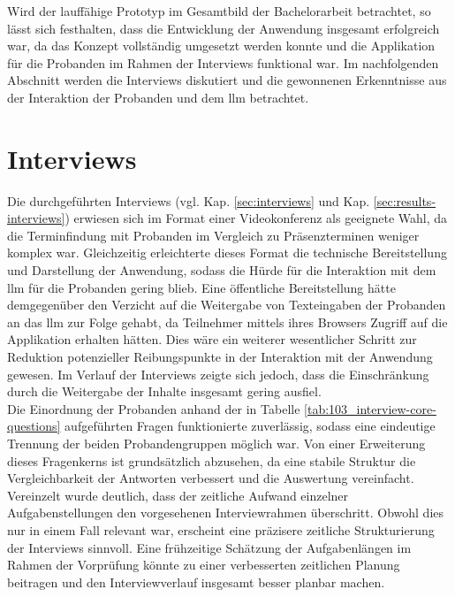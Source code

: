 Wird der lauffähige Prototyp im Gesamtbild der Bachelorarbeit betrachtet, so lässt sich festhalten,
dass die Entwicklung der Anwendung insgesamt erfolgreich war, da das Konzept vollständig umgesetzt werden konnte und die Applikation für die Probanden im Rahmen der Interviews funktional war.
Im nachfolgenden Abschnitt werden die Interviews diskutiert und die gewonnenen Erkenntnisse aus der Interaktion der Probanden und dem \gls{llm} betrachtet.

\section{Interviews}
\label{sec:discussion-interviews}

Die durchgeführten Interviews (vgl. Kap. \ref{sec:interviews} und Kap. \ref{sec:results-interviews}) erwiesen sich im Format einer Videokonferenz als geeignete Wahl,
da die Terminfindung mit Probanden im Vergleich zu Präsenzterminen weniger komplex war.
Gleichzeitig erleichterte dieses Format die technische Bereitstellung und Darstellung der Anwendung,
sodass die Hürde für die Interaktion mit dem \gls{llm} für die Probanden gering blieb.
Eine öffentliche Bereitstellung hätte demgegenüber den Verzicht auf die Weitergabe von Texteingaben der Probanden an das \gls{llm} zur Folge gehabt,
da Teilnehmer mittels ihres Browsers Zugriff auf die Applikation erhalten hätten.
Dies wäre ein weiterer wesentlicher Schritt zur Reduktion potenzieller Reibungspunkte in der Interaktion mit der Anwendung gewesen.
Im Verlauf der Interviews zeigte sich jedoch, dass die Einschränkung durch die Weitergabe der Inhalte insgesamt gering ausfiel.  \\

Die Einordnung der Probanden anhand der in Tabelle \ref{tab:103_interview-core-questions} aufgeführten Fragen funktionierte zuverlässig,
sodass eine eindeutige Trennung der beiden Probandengruppen möglich war. Von einer Erweiterung dieses Fragenkerns ist grundsätzlich abzusehen,
da eine stabile Struktur die Vergleichbarkeit der Antworten verbessert und die Auswertung vereinfacht. \\

Vereinzelt wurde deutlich, dass der zeitliche Aufwand einzelner Aufgabenstellungen den vorgesehenen Interviewrahmen überschritt.
Obwohl dies nur in einem Fall relevant war, erscheint eine präzisere zeitliche Strukturierung der Interviews sinnvoll.
Eine frühzeitige Schätzung der Aufgabenlängen im Rahmen der Vorprüfung könnte zu einer verbesserten zeitlichen Planung beitragen
und den Interviewverlauf insgesamt besser planbar machen. \\

